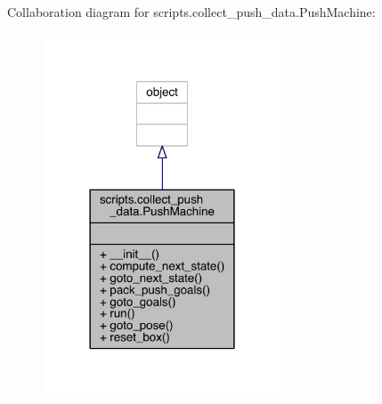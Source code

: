 Collaboration diagram for scripts.\+collect\+\_\+push\+\_\+data.\+Push\+Machine\+:\nopagebreak
\begin{figure}[H]
\begin{center}
\leavevmode
\includegraphics[width=201pt]{classscripts_1_1collect__push__data_1_1_push_machine__coll__graph}
\end{center}
\end{figure}
